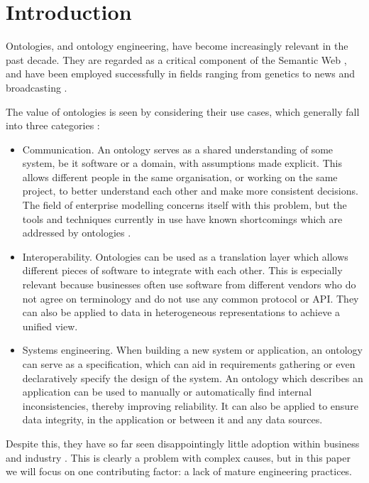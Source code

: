 \documentclass{sig-alternate}
\begin{document}
\section{Introduction}

Ontologies, and ontology engineering, have become increasingly relevant in the past decade.  They are regarded as a critical component of the Semantic Web \cite{BernersLee:SemanticWeb}, and have been employed successfully in fields ranging from genetics \cite{GeneOntology:GoingForward} to news and broadcasting \cite{BBC:LinkedData}.

The value of ontologies is seen by considering their use cases, which generally fall into three categories \cite{Uschold:Ontologies}:
\begin{itemize}
  \item Communication.  An ontology serves as a shared understanding of some system, be it software or a domain, with assumptions made explicit.  This allows different people in the same organisation, or working on the same project, to better understand each other and make more consistent decisions.  The field of enterprise modelling concerns itself with this problem, but the tools and techniques currently in use have known shortcomings which are addressed by ontologies \cite{Kaczmarek:EnterpriseModelling}.
  \item Interoperability.  Ontologies can be used as a translation layer which allows different pieces of software to integrate with each other.  This is especially relevant because businesses often use software from different vendors who do not agree on terminology and do not use any common protocol or API.  They can also be applied to data in heterogeneous representations to achieve a unified view.
  \item Systems engineering.  When building a new system or application, an ontology can serve as a specification, which can aid in requirements gathering or even declaratively specify the design of the system.  An ontology which describes an application can be used to manually or automatically find internal inconsistencies, thereby improving reliability.  It can also be applied to ensure data integrity, in the application or between it and any data sources.
\end{itemize}

Despite this, they have so far seen disappointingly little adoption within business and industry \cite{Cardoso:SemanticWebVision,Kaczmarek:EnterpriseModelling}.  This is clearly a problem with complex causes, but in this paper we will focus on one contributing factor: a lack of mature engineering practices.
\end{document}
